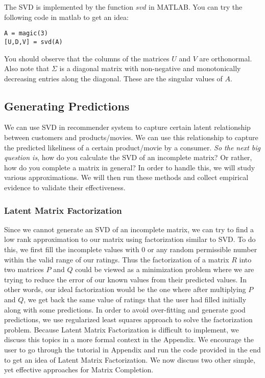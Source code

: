 The SVD is implemented by the function $svd$ in MATLAB. You can try the following code in matlab to get an idea:
\begin{verbatim}
A = magic(3)
[U,D,V] = svd(A)
\end{verbatim}

You should observe that the columns of the matrices $U$ and $V$ are orthonormal. Also note that $\Sigma$ is a diagonal matrix with non-negative and monotonically decreasing entries along the diagonal. These are the singular values of $A$.
  \subsection{Generating Predictions}
  We can use SVD in recommender system to capture certain latent relationship between customers and products/movies. We can use this relationship to capture the predicted likeliness of a certain product/movie by a consumer. \textit{So the next big question is}, how do you calculate the SVD of an incomplete matrix? Or rather, how do you complete a matrix in general? In order to handle this, we will study various approximations. We will then run these methods and collect empirical evidence to validate their effectiveness.
  \subsubsection{Latent Matrix Factorization}
  Since we cannot generate an SVD of an incomplete matrix, we can try to find a low rank approximation to our matrix using factorization similar to SVD. To do this, we first fill the incomplete values with 0 or any random permissible number within the valid range of our ratings. Thus the factorization of a matrix $R$ into two matrices $P$ and $Q$ could be viewed as a minimization problem where we are trying to reduce the error of our known values from their predicted values. In other words, our ideal factorization would be the one where after multiplying $P$ and $Q$, we get back the same value of ratings that the user had filled initially along with some predictions. In order to avoid over-fitting and generate good predictions, we use regularized least squares approach to solve the factorization problem. Because Latent Matrix Factorization is difficult to implement, we discuss this topics in a more formal context in the Appendix. We encourage the user to go through the tutorial in Appendix and run the code provided in the end to get an idea of Latent Matrix Factorization. We now discuss two other simple, yet effective approaches for Matrix Completion.
